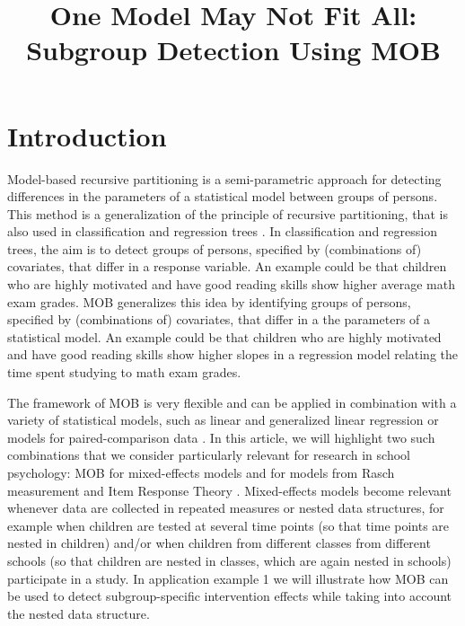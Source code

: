 \documentclass[doc,floatsintext,natbib]{apa7}
\title{One Model May Not Fit All: Subgroup Detection Using MOB}
\begin{document}

\renewenvironment{Schunk}{\small}{}


\maketitle





\newpage
\section{Introduction}
\label{sec:Introduction}

Model-based recursive partitioning \citep[MOB,][]{ZeilyHoth08} is a semi-parametric approach for detecting differences in the parameters of a statistical
model between groups of persons. This method is a generalization of the principle of recursive partitioning, that is also used in classification and regression trees \citet{Breetal:1984}. 
In classification and regression trees, the aim is to detect groups of persons, specified by (combinations of) covariates, that differ in a response variable. An example could be that children who are highly motivated and have good reading skills show higher average math exam grades. 
MOB generalizes this idea by identifying groups of persons, specified by (combinations of) covariates, that differ in a the parameters of a statistical model. An example could be that children who are highly motivated and have good reading skills show higher slopes in a regression model relating the time spent studying to math exam grades. 

The framework of MOB is very flexible and can be applied in combination with a variety of statistical models, such as linear and generalized linear regression \citep{KopAugStr:2013,ZeilyHoth08} or models for paired-comparison data \citep{StrWicZei:2011:JoEaBS}. In this article, we will highlight two such combinations that we consider particularly relevant for research in school psychology: MOB for mixed-effects models \cite{FokkySmit18} and for models from Rasch measurement and Item Response Theory \citep[IRT,][]{StrKopZei:2015:P,KomStrZei:2017:EaPM,HenDebStr:2023:EPM}. Mixed-effects models become relevant whenever data are collected in repeated measures or nested data structures, for example when children are tested at several time points (so that time points are nested in children) and/or when children from different classes from different schools (so that children are nested in classes, which are again nested in schools) participate in a study. In application example 1 we will illustrate how MOB can be used to detect subgroup-specific intervention effects while taking into account the nested data structure. 
\end{document}
